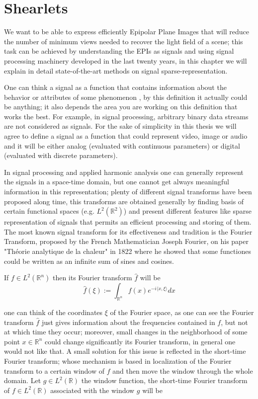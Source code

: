 \chapter{Shearlets}

We want to be able to express efficiently Epipolar Plane Images that will reduce the number of minimum views needed to recover the light field of a scene; this task can be achieved by understanding the EPIs as signals and using signal processing machinery developed in the last twenty years, in this chapter we will explain in detail state-of-the-art methods on signal sparse-representation.

\bigskip

One can think a signal as a function that contains information about the behavior or attributes of some phenomenon \cite{Roland}, by this definition it actually could be anything; it also depends the area you are working on this definition that works the best. For example, in signal processing, arbitrary binary data streams are not considered as signals. For the sake of simplicity in this thesis we will agree to define a signal as a function that could represent video, image or audio and it will be either analog (evaluated with continuous parameters) or digital (evaluated with discrete parameters). 

\bigskip

In signal processing and applied harmonic analysis one can generally represent the signals in a space-time domain, but one cannot get always meaningful information in this representation; plenty of different signal transforms have been proposed along time, this transforms are obtained generally by finding basis of certain functional spaces (e.g. $L^2(\mathbb{R}^2)$) and present different features like sparse representation of signals that permits an efficient processing and storing of them. The most known signal transform for its effectiveness and tradition is the Fourier Transform, proposed by the French Mathematician Joseph Fourier, on his paper "Théorie analytique de la chaleur" in 1822 where he showed that some functiones could be written as an infinite sum of sines and cosines. 

\bigskip

If $f\in L^2(\mathbb{R}^n)$ then its Fourier transform $\hat{f}$ will be 
$$
\hat{f}(\xi) := \int_{\mathbb{R}^n}f(x)e^{-i\langle x,\xi\rangle}dx
$$

one can think of the coordinates $\xi$ of the Fourier space, as one can see the Fourier transform $\hat{f}$ just gives information about the frequencies contained in $f$, but not at which time they occur; moreover, small changes in the neighborhood of some point $x\in\mathbb{R}^n$ could change significantly its Fourier transform, in general one would not like that. A small solution for this issue is reflected in the short-time Fourier transform; whose mechanism is based in localization of the Fourier transform to a certain window of $f$ and then move the window through the whole domain. Let $g\in L^2(\mathbb{R})$ the window function, the short-time Fourier transform of $f\in L^2(\mathbb{R})$ associated with the window $g$ will be

